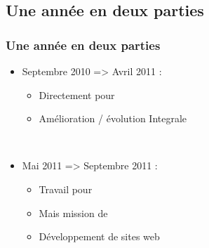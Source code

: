\subsection{Une année en deux parties}

\begin{frame}
	\frametitle{Une année en deux parties}

	\begin{itemize}
		\item Septembre 2010 => Avril 2011 :
			\begin{itemize}
				\item Directement pour \solulog\sautligne

				\item Amélioration / évolution \og Integrale \fg
			\end{itemize}~

		\item Mai 2011 => Septembre 2011 :
			\begin{itemize}
				\item Travail pour \fidit
				\item Mais mission de \solulog\sautligne

				\item Développement de sites web
			\end{itemize}
	\end{itemize}
\end{frame}
